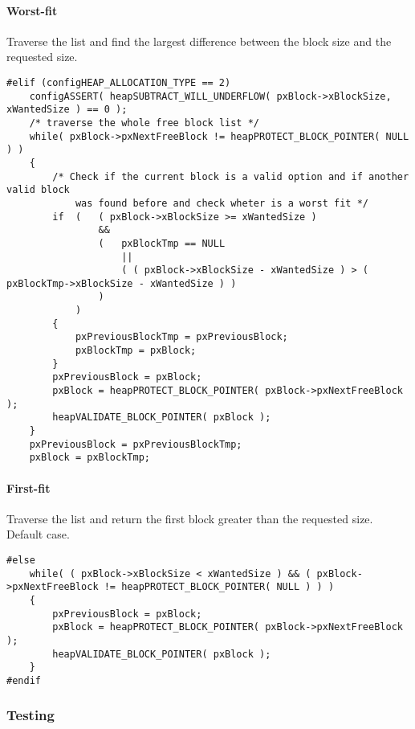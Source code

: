     \paragraph{Worst-fit} Traverse the list and find the largest difference between the block size and the requested size.

    \begin{codebox}
    \begin{lstlisting}
#elif (configHEAP_ALLOCATION_TYPE == 2)
    configASSERT( heapSUBTRACT_WILL_UNDERFLOW( pxBlock->xBlockSize, xWantedSize ) == 0 );
    /* traverse the whole free block list */
    while( pxBlock->pxNextFreeBlock != heapPROTECT_BLOCK_POINTER( NULL ) )
    {
        /* Check if the current block is a valid option and if another valid block
            was found before and check wheter is a worst fit */
        if  (   ( pxBlock->xBlockSize >= xWantedSize )
                &&
                (   pxBlockTmp == NULL
                    ||
                    ( ( pxBlock->xBlockSize - xWantedSize ) > ( pxBlockTmp->xBlockSize - xWantedSize ) )
                )
            )
        {
            pxPreviousBlockTmp = pxPreviousBlock;
            pxBlockTmp = pxBlock;
        }
        pxPreviousBlock = pxBlock;
        pxBlock = heapPROTECT_BLOCK_POINTER( pxBlock->pxNextFreeBlock );
        heapVALIDATE_BLOCK_POINTER( pxBlock );
    }
    pxPreviousBlock = pxPreviousBlockTmp;
    pxBlock = pxBlockTmp;
    \end{lstlisting}
    \end{codebox}

    \paragraph{First-fit} Traverse the list and return the first block greater than the requested size. Default case.

    \begin{codebox}
    \begin{lstlisting}
#else
    while( ( pxBlock->xBlockSize < xWantedSize ) && ( pxBlock->pxNextFreeBlock != heapPROTECT_BLOCK_POINTER( NULL ) ) )
    {
        pxPreviousBlock = pxBlock;
        pxBlock = heapPROTECT_BLOCK_POINTER( pxBlock->pxNextFreeBlock );
        heapVALIDATE_BLOCK_POINTER( pxBlock );
    }
#endif
    \end{lstlisting}
    \end{codebox}

    \subsubsection{Testing}
